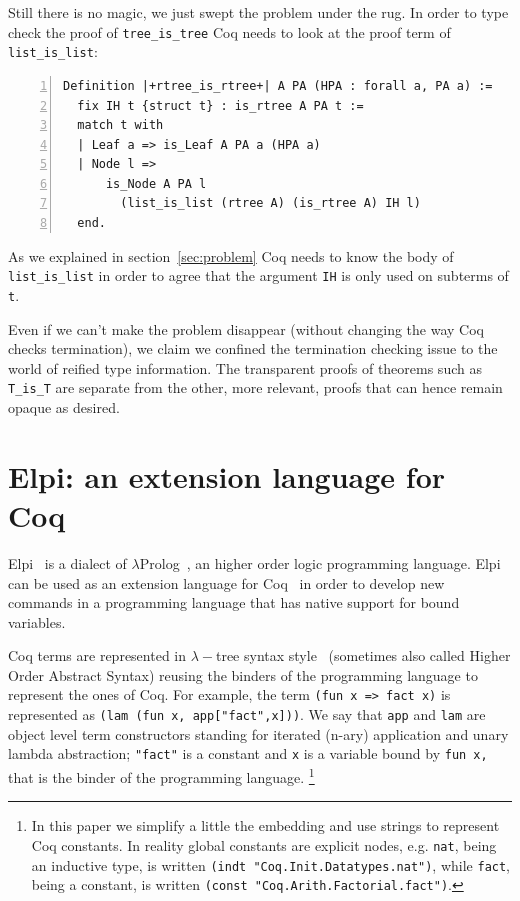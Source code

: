 \documentclass[sigplan,10pt,review]{acmart}\settopmatter{printfolios=true,printccs=false,printacmref=false}
\begin{document}
Still there is no magic, we just swept the problem under the rug.
In order to type check the proof
of \lstinline+tree_is_tree+ Coq needs to look at the
proof term of \lstinline+list_is_list+:

\begin{minipage}{\textwidth}\begin{lstlisting}[numbers=left]
Definition |+rtree_is_rtree+| A PA (HPA : forall a, PA a) :=
  fix IH t {struct t} : is_rtree A PA t :=
  match t with
  | Leaf a => is_Leaf A PA a (HPA a)
  | Node l =>
      is_Node A PA l
        (list_is_list (rtree A) (is_rtree A) IH l)
  end.
\end{lstlisting}\end{minipage}

\noindent
As we explained in section~\ref{sec:problem} Coq needs to know the
body of  \lstinline+list_is_list+ in order to agree that the argument
\lstinline+IH+ is only used on subterms of \lstinline+t+.

Even if we can't make the problem disappear (without changing the way Coq
checks termination), we claim we confined the termination checking issue
to the world of reified type information. The transparent proofs of
theorems such as \lstinline+T_is_T+ are separate from the other, more
relevant, proofs that can hence remain opaque as desired.

\section{Elpi: an extension language for Coq} %
\label{sec:elpilang}

Elpi~\cite{dunchev:hal-01176856} is a dialect of
$\lambda$Prolog~\cite{miller_nadathur_2012}, an higher order logic
programming language. Elpi can be used as an extension language for
Coq~\cite{tassi:hal-01637063} in order to develop new commands in a programming
language that has native support for bound variables.

Coq terms are represented in $\lambda-$tree syntax
style~\cite{10.1007/3-540-44957-4_16} (sometimes also called
Higher Order Abstract Syntax) reusing the binders of the programming
language to represent the ones of Coq.
For example, the
term \lstinline+(fun x => fact x)+ is represented as
\lstinline+(lam (fun x, app["fact",x]))+. 
We say that \lstinline+app+ and \lstinline+lam+ are object level term
constructors standing for iterated (n-ary) application and unary lambda
abstraction; \lstinline+"fact"+ is a constant and \lstinline+x+ is a
variable bound by \lstinline+fun x,+ that is the binder
of the programming language.  \footnote{In this paper we simplify
a little the embedding and use strings to represent Coq constants.
In reality
global constants are explicit nodes, e.g. \lstinline+nat+,
being an inductive type,
is written \lstinline+(indt "Coq.Init.Datatypes.nat")+,
while \lstinline+fact+, being a constant,
is written \lstinline+(const "Coq.Arith.Factorial.fact")+.}
\end{document}
